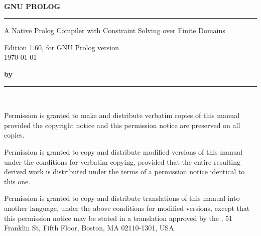 \pagestyle{empty}
\setlength{\parskip}{0pt}
~

\vspace{4cm}
{\huge\bf GNU PROLOG}
\vspace{3mm}

\rule[2mm]{\linewidth}{2mm}

\begin{flushright}
{\Large
A Native Prolog Compiler with Constraint Solving over Finite Domains

Edition 1.60, for GNU Prolog version \\
\today
}
\end{flushright}
\vspace{5cm}
\vspace{5cm}

{\Large\bf by }

\rule[2mm]{\linewidth}{1mm}



\newpage
~

\vspace{17cm}

\setlength{\parskip}{\saveparskip}



Permission is granted to make and distribute verbatim copies of this manual
provided the copyright notice and this permission notice are preserved on all
copies.

Permission is granted to copy and distribute modified versions of this manual
under the conditions for verbatim copying, provided that the entire resulting
derived work is distributed under the terms of a permission notice identical
to this one.

Permission is granted to copy and distribute translations of this manual into
another language, under the above conditions for modified versions, except
that this permission notice may be stated in a translation approved by the
, 51 Franklin St, Fifth Floor, Boston, MA  02110-1301, USA.


\newpage
\pagestyle{fancy}
\setcounter{page}{1}

